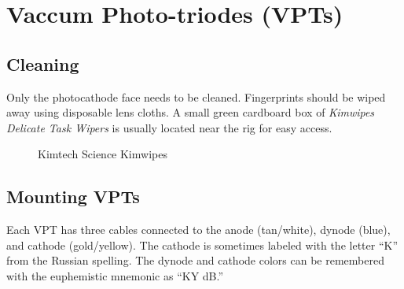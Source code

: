 \chapter{Vaccum Photo-triodes (VPTs)}
\label{sec:op_vpt}

\section{Cleaning}
\label{sec:op_vpt:cleaning}

Only the photocathode face needs to be cleaned.  Fingerprints should be wiped away using disposable lens cloths.  A small green cardboard box of \textit{Kimwipes Delicate Task Wipers} is usually located near the rig for easy access.

\begin{figure}[hbtp]
  \centering
  \caption{Kimtech Science Kimwipes}
  \label{fig:op_vpt:cleaning:kimwipes}
\end{figure}




\section{Mounting VPTs}
\label{sec:op_vpt:mounting}

Each VPT has three cables connected to the anode (tan/white), dynode (blue), and cathode (gold/yellow).  The cathode is sometimes labeled with the letter ``K'' from the Russian spelling.  The dynode and cathode colors can be remembered with the euphemistic mnemonic as ``KY dB.''


